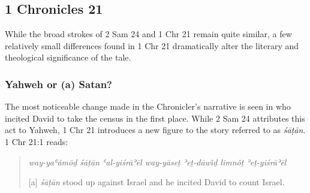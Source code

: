 \hypertarget{chronicles-21}{%
\subsection{1 Chronicles 21}\label{chronicles-21}}

While the broad strokes of 2 Sam 24 and 1 Chr 21 remain quite similar, a
few relatively small differences found in 1 Chr 21 dramatically alter
the literary and theological significance of the tale.

\hypertarget{yahweh-or-a-satan}{%
\subsubsection{Yahweh or (a) Satan?}\label{yahweh-or-a-satan}}

The most noticeable change made in the Chronicler's narrative is seen in
who incited David to take the census in the first place. While 2 Sam 24
attributes this act to Yahweh, 1 Chr 21 introduces a new figure to the
story referred to as \emph{śāṭān}. 1 Chr 21:1 reads:

\begin{quote}
\emph{way-yaʿămōḏ śāṭān ʿal-yiśrāʾēl way-yāseṯ ʾeṯ-dāwı̂ḏ limnôṯ
ʾeṯ-yiśrāʾēl}

{[}a{]} \emph{śāṭān} stood up against Israel and he incited David to
count Israel.
\end{quote}

